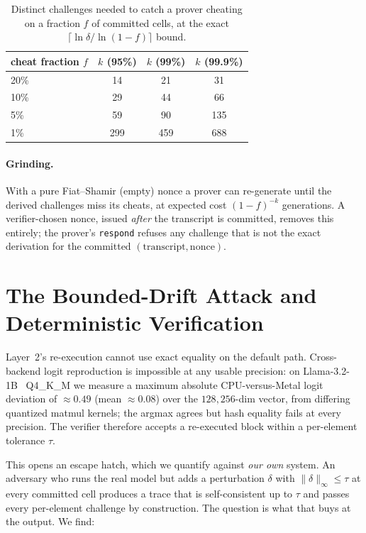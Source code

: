 \documentclass[11pt]{article}
\newcommand{\code}[1]{\texttt{#1}}
\begin{document}
\begin{table}[t]
\centering
\small
\begin{tabular}{lccc}
\toprule
cheat fraction $f$ & $k$ (95\%) & $k$ (99\%) & $k$ (99.9\%)\\
\midrule
20\% & 14 & 21 & 31\\
10\% & 29 & 44 & 66\\
5\%  & 59 & 90 & 135\\
1\%  & 299 & 459 & 688\\
\bottomrule
\end{tabular}
\caption{Distinct challenges needed to catch a prover cheating on a fraction $f$
of committed cells, at the exact $\lceil \ln\delta / \ln(1-f)\rceil$ bound.}
\label{tab:catch}
\end{table}

\paragraph{Grinding.} With a pure Fiat--Shamir (empty) nonce a prover can
re-generate until the derived challenges miss its cheats, at expected cost
$(1-f)^{-k}$ generations. A verifier-chosen nonce, issued \emph{after} the
transcript is committed, removes this entirely; the prover's \code{respond}
refuses any challenge that is not the exact derivation for the committed
$(\text{transcript}, \text{nonce})$.

\section{The Bounded-Drift Attack and Deterministic Verification}\label{sec:drift}

Layer~2's re-execution cannot use exact equality on the default path.
Cross-backend logit reproduction is impossible at any usable precision: on
Llama-3.2-1B~\cite{llama3} Q4\_K\_M we measure a maximum absolute CPU-versus-Metal
logit deviation of ${\approx}0.49$ (mean ${\approx}0.08$) over the $128{,}256$-dim
vector, from differing quantized matmul kernels; the argmax agrees but hash
equality fails at every precision. The verifier therefore accepts a re-executed
block within a per-element tolerance $\tau$.

This opens an escape hatch, which we quantify against \emph{our own} system. An
adversary who runs the real model but adds a perturbation $\delta$ with
$\|\delta\|_\infty \le \tau$ at every committed cell produces a trace that is
self-consistent up to $\tau$ and passes every per-element challenge by
construction. The question is what that buys at the output. We find:
\end{document}
